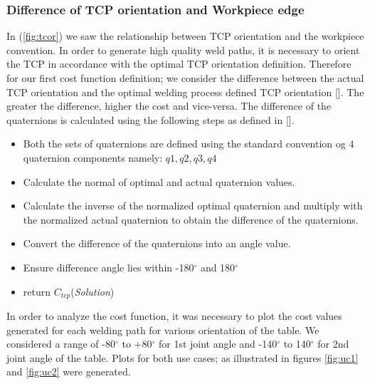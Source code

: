 \subsubsection{Difference of TCP orientation and Workpiece edge}
\label{sssec:tcpcst}
In (\ref{fig:tcor}) we saw the relationship between TCP orientation and the workpiece convention. In order to generate high quality weld paths, it is necessary to orient the TCP in accordance with the optimal TCP orientation definition. Therefore for our first cost function definition; we consider the difference between the actual TCP orientation and the optimal welding process defined TCP orientation [\citet{DiazP2016}]. The greater the difference, higher the cost and vice-versa. The difference of the quaternions is calculated using the following steps as defined in [\citet{DiazP2016}].
\begin{itemize}
	\label{algo4ppr}
	\item Both the sets of quaternions are defined using the standard convention og 4 quaternion components namely: $q1,q2,q3,q4$
	\item Calculate the normal of optimal and actual quaternion values.
	\item Calculate the inverse of the normalized optimal quaternion and multiply with the normalized actual quaternion to obtain the difference of the quaternions.
	\item Convert the difference of the quaternions into an angle value.
	\item Ensure difference angle lies within -180$^{\circ}$ and 180$^{\circ}$
	\item return $C_{tcp}$(\textit{Solution})
\end{itemize}
In order to analyze the cost function, it was necessary to plot the cost values generated for each welding path for various orientation of the table. We considered a range of -80$^{\circ}$ to +80$^{\circ}$ for 1st joint angle and -140$^{\circ}$ to 140$^{\circ}$ for 2nd joint angle of the table. Plots for both use cases; as illustrated in figures \ref{fig:uc1} and \ref{fig:uc2}
were generated.
